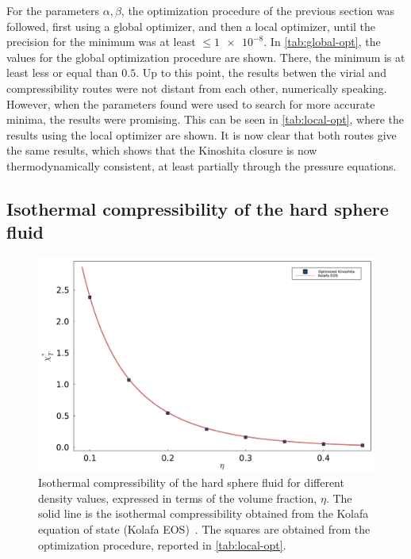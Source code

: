 For the parameters \(\alpha, \beta\), the optimization procedure of the previous section 
was followed, first using a global optimizer, and then a local optimizer, until the 
precision for the minimum was at least \(\leq \num{1e-8} .\) 
In \autoref{tab:global-opt}, the values for the global optimization procedure are shown. 
There, the minimum is at least less or equal than \(0.5\). 
Up to this point, the results betwen the virial and compressibility routes were not distant 
from each other, numerically speaking. However, when the parameters found were used to 
search for more accurate minima, the results were promising. This can be seen in 
\autoref{tab:local-opt}, where the results using the local optimizer are shown. It is now 
clear that both routes give the same results, which shows that the Kinoshita closure is now 
thermodynamically consistent, at least partially through the pressure equations.

\subsection{Isothermal compressibility of the hard sphere fluid}
\begin{figure}
    \centering
    \includegraphics[scale=0.32]{figuras/capitulo-5/chi-eta.pdf}
    \caption{Isothermal compressibility of the hard sphere fluid for different density values, expressed in terms of the volume fraction, \(\eta .\) The solid line is the isothermal compressibility obtained from the Kolafa equation of state (Kolafa EOS)~\cite{kolafaAccurateEquationState2004}. The squares are obtained from the optimization procedure, reported in \autoref{tab:local-opt}.}
    \label{fig:isothermal-results}
\end{figure}

